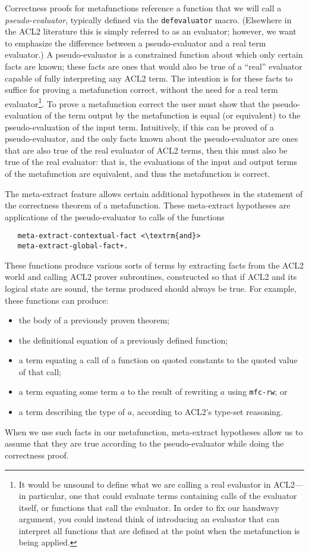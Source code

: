 Correctness proofs for metafunctions reference a
function that we will call a \textit{pseudo-evaluator}, typically
defined via the \texttt{defevaluator} macro.  (Elsewhere in the ACL2
literature this is simply referred to as an evaluator; however, we
want to emphasize the difference between a pseudo-evaluator and a real
term evaluator.)  A pseudo-evaluator is a constrained function about
which only certain facts are known; these facts are ones that would
also be true of a ``real'' evaluator capable of fully interpreting any
ACL2 term.  The intention is for these facts to suffice for
proving a metafunction correct, without the need for
a real term evaluator\footnote{
  It would be unsound to define what we are calling a real evaluator
  in ACL2---in particular, one that could evaluate terms containing
  calls of the evaluator itself, or functions that call the evaluator.
  In order to fix our handwavy argument, you could instead think of
  introducing an evaluator that can interpret all functions that are
  defined at the point when the metafunction is being applied.
}.
To prove a metafunction correct
the user must show that the pseudo-evaluation of the term output by
the metafunction is equal (or equivalent) to the pseudo-evaluation of
the input term.  Intuitively, if this can be proved of a
pseudo-evaluator, and the only facts known about the pseudo-evaluator
are ones that are also true of the real evaluator of ACL2 terms, then
this must also be true of the real evaluator: that is, the evaluations
of the input and output terms of the metafunction are equivalent, and
thus the metafunction is correct.

The meta-extract feature allows certain additional hypotheses in the
statement of the correctness theorem of a metafunction.  These meta-extract
hypotheses are applications of the pseudo-evaluator to calls of the
functions
\begin{lstlisting}
   meta-extract-contextual-fact <\textrm{and}>
   meta-extract-global-fact+.
 \end{lstlisting}
 These functions produce various
sorts of terms by extracting facts from the ACL2 world and calling
ACL2 prover subroutines, constructed so that if ACL2 and its logical
state are sound, the terms produced should always be true.  For
example, these functions can produce:
\begin{itemize}
\item the body of a previously proven theorem;
\item the definitional equation of a previously defined function;
\item a term equating a call of a function on quoted constants to the
  quoted value of that call;
\item a term equating some term $a$ to the result of rewriting $a$
  using \texttt{mfc-rw}; or
\item a term describing the type of $a$, according to ACL2's type-set
  reasoning.
\end{itemize}
When we use such facts in our metafunction, meta-extract hypotheses
allow us to assume that they are true according to the
pseudo-evaluator while doing the correctness proof.

